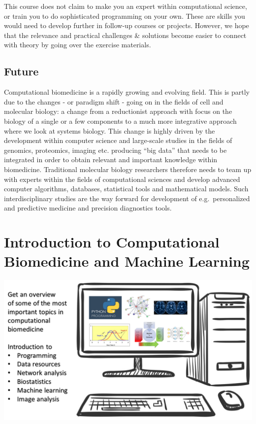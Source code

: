 \documentclass[
]{book}
\begin{document}
This course does not claim to make you an expert within computational science, or train you to do sophisticated programming on your own. These are skills you would need to develop further in follow-up courses or projects. However, we hope that the relevance and practical challenges \& solutions become easier to connect with theory by going over the exercise materials.

\hypertarget{future}{%
\section{Future}\label{future}}

Computational biomedicine is a rapidly growing and evolving field. This is partly due to the changes - or paradigm shift - going on in the fields of cell and molecular biology: a change from a reductionist approach with focus on the biology of a single or a few components to a much more integrative approach where we look at systems biology. This change is highly driven by the development within computer science and large-scale studies in the fields of genomics, proteomics, imaging etc. producing ``big data'' that needs to be integrated in order to obtain relevant and important knowledge within biomedicine. Traditional molecular biology researchers therefore needs to team up with experts within the fields of computational sciences and develop advanced computer algorithms, databases, statistical tools and mathematical models. Such interdisciplinary studies are the way forward for development of e.g.~personalized and predictive medicine and precision diagnostics tools.

\hypertarget{introduction-to-computational-biomedicine-and-machine-learning}{%
\chapter{Introduction to Computational Biomedicine and Machine Learning}\label{introduction-to-computational-biomedicine-and-machine-learning}}

\includegraphics{assets/overview.png}
\end{document}
